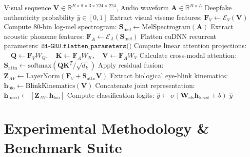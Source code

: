 \documentclass[journal]{IEEEtran}
\begin{document}
\begin{algorithm}[!t]
\caption{ST2-SyncNet Multimodal Synchronization Forward Pass}
\label{alg:st2_forward}
\begin{algorithmic}[1]
\REQUIRE Visual sequence $\mathbf{V} \in \mathbb{R}^{B \times 8 \times 3 \times 224 \times 224}$, Audio waveform $\mathbf{A} \in \mathbb{R}^{B \times L}$
\ENSURE Deepfake authenticity probability $\hat{y} \in [0, 1]$
\STATE Extract visual viseme features: $\mathbf{F}_V \leftarrow \mathcal{E}_V(\mathbf{V})$
\STATE Compute 80-bin log-mel spectrogram: $\mathbf{S}_{\text{mel}} \leftarrow \text{MelSpectrogram}(\mathbf{A})$
\STATE Extract acoustic phoneme features: $\mathbf{F}_A \leftarrow \mathcal{E}_A(\mathbf{S}_{\text{mel}})$
\STATE Flatten cuDNN recurrent parameters: $\texttt{Bi-GRU.flatten\_parameters()}$
\STATE Compute linear attention projections:
\STATE $\quad \mathbf{Q} \leftarrow \mathbf{F}_V W_Q, \quad \mathbf{K} \leftarrow \mathbf{F}_A W_K, \quad \mathbf{V} \leftarrow \mathbf{F}_A W_V$
\STATE Calculate cross-modal attention: $\mathbf{S}_{\text{attn}} \leftarrow \text{softmax}(\mathbf{Q}\mathbf{K}^T / \sqrt{d_k})$
\STATE Apply residual fusion: $\mathbf{Z}_{AV} \leftarrow \text{LayerNorm}(\mathbf{F}_V + \mathbf{S}_{\text{attn}}\mathbf{V})$
\STATE Extract biological eye-blink kinematics: $\mathbf{h}_{\text{bio}} \leftarrow \text{BlinkKinematics}(\mathbf{V})$
\STATE Concatenate joint representation: $\mathbf{h}_{\text{fused}} \leftarrow [\mathbf{Z}_{AV}; \mathbf{h}_{\text{bio}}]$
\STATE Compute classification logits: $\hat{y} \leftarrow \sigma(\mathbf{W}_{\text{cls}} \mathbf{h}_{\text{fused}} + b)$
\RETURN $\hat{y}$
\end{algorithmic}
\end{algorithm}

\section{Experimental Methodology \& Benchmark Suite}
\end{document}

